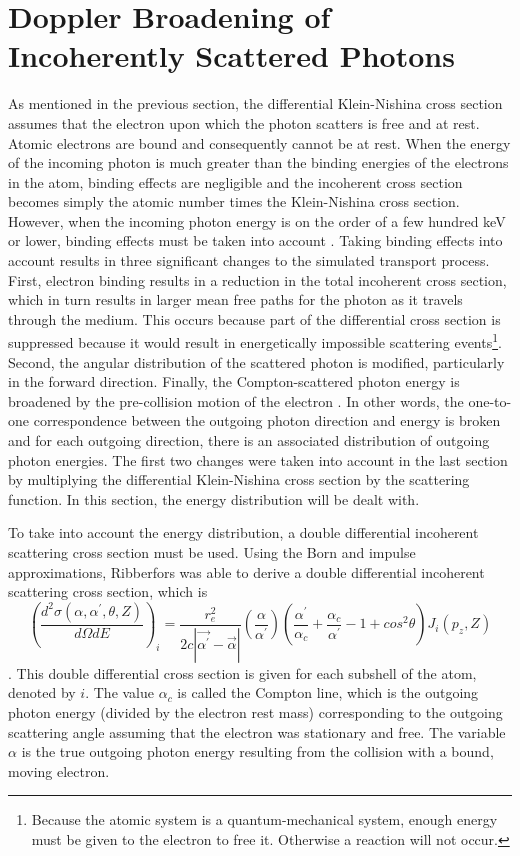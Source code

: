 \section{Doppler Broadening of Incoherently Scattered Photons}
\label{sec:photon_dopp_broadening}
As mentioned in the previous section, the differential Klein-Nishina cross 
section assumes that the electron upon which the photon scatters is free
and at rest. Atomic electrons are bound and consequently cannot be at rest. 
When the energy of the incoming photon is much greater than the binding 
energies of the electrons in the atom, binding effects are negligible and the
incoherent cross section becomes simply the atomic number times the 
Klein-Nishina cross section. However, when the incoming photon energy is on the
order of a few hundred keV or lower, binding effects must be taken into account
\citep{namito_implementation_1994}. Taking binding effects into account results
in three significant changes to the simulated transport process. First, electron
binding results in a reduction in the total incoherent cross section, which
in turn results in larger mean free paths for the photon as it travels through
the medium. This occurs because part of the differential cross section is
suppressed because it would result in energetically impossible scattering 
events\footnote{Because the atomic system is a quantum-mechanical system, enough
energy must be given to the electron to free it. Otherwise a reaction will not
occur.}. Second, the angular distribution of the scattered photon is 
modified, particularly in the forward direction. Finally, the Compton-scattered
photon energy is broadened by the pre-collision motion of the electron 
\citep{namito_implementation_1994}. In other words, the one-to-one 
correspondence between the outgoing photon direction and energy is broken and 
for each outgoing direction, there is an associated distribution of outgoing 
photon energies. The first two changes were taken into account in the last
section by multiplying the differential Klein-Nishina cross section by the 
scattering function. In this section, the energy distribution will be dealt
with. 

To take into account the energy distribution, a double differential
incoherent scattering cross section must be used. Using the Born and impulse
approximations, Ribberfors was able to derive a double differential
incoherent scattering cross section, which is 
\begin{equation}
  \left(\frac{d^2\sigma(\alpha,\alpha^{'},\theta,Z)}{d\Omega dE}\right)_i = 
  \frac{r_e^2}{2c\left|\vec{\alpha^{'}} - 
    \vec{\alpha}\right|} \left(\frac{\alpha}{\alpha^{'}}\right) 
  \left(\frac{\alpha^{'}}{\alpha_c} + \frac{\alpha_c}{\alpha^{'}} - 1 + 
  cos^2\theta \right) J_i(p_z,Z)
\end{equation}
\citep{ribberfors_x-ray_1983}. This double differential cross section is given 
for each subshell of the atom, denoted by $i$. The value $\alpha_c$ is called 
the Compton line, which is the outgoing photon energy (divided by the electron 
rest mass) corresponding to the outgoing scattering angle assuming that the 
electron was stationary and free. The variable $\alpha$ is the true outgoing 
photon energy resulting from the collision with a bound, moving electron.

